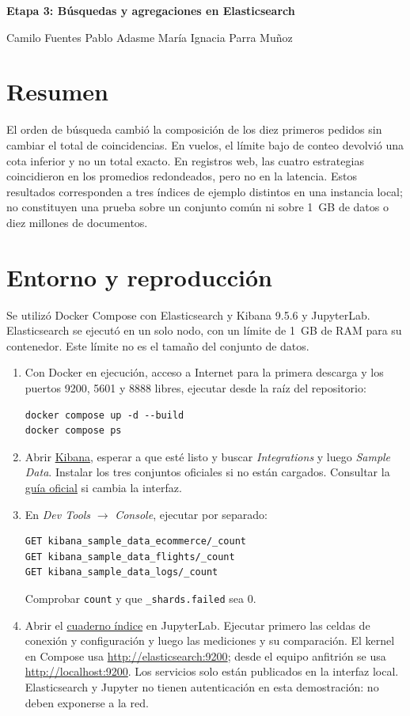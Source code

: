 \documentclass[11pt,a4paper]{article}
\newcommand{\codigo}[1]{\texttt{#1}}
\begin{document}
\begin{center}
{\LARGE\bfseries Etapa 3: Búsquedas y agregaciones en Elasticsearch\par}
\smallskip
Camilo Fuentes \quad Pablo Adasme \quad María Ignacia Parra Muñoz
\end{center}

\section*{Resumen}
El orden de búsqueda cambió la composición de los diez primeros pedidos sin
cambiar el total de coincidencias. En vuelos, el límite bajo de conteo devolvió
una cota inferior y no un total exacto. En registros web, las cuatro estrategias
coincidieron en los promedios redondeados, pero no en la latencia. Estos resultados
corresponden a tres índices de ejemplo distintos en una instancia local; no
constituyen una prueba sobre un conjunto común ni sobre 1~GB de datos o diez
millones de documentos.

\section{Entorno y reproducción}
Se utilizó Docker Compose con Elasticsearch y Kibana 9.5.6 y JupyterLab.
Elasticsearch se ejecutó en un solo nodo, con un límite de 1~GB de RAM para
su contenedor. Este límite no es el tamaño del conjunto de datos.

\begin{enumerate}
\setlength{\itemsep}{0pt}
\item Con Docker en ejecución, acceso a Internet para la primera descarga y
los puertos 9200, 5601 y 8888 libres, ejecutar desde la raíz del repositorio:
\begin{verbatim}
docker compose up -d --build
docker compose ps
\end{verbatim}
\item Abrir \href{http://localhost:5601}{Kibana}, esperar a que esté listo
y buscar \textit{Integrations} y luego \textit{Sample Data}. Instalar los tres
conjuntos oficiales si no están cargados. Consultar la
\href{https://www.elastic.co/docs/manage-data/ingest/sample-data}{guía oficial}
si cambia la interfaz.
\item En \textit{Dev Tools} $\to$ \textit{Console}, ejecutar por separado:
\begin{verbatim}
GET kibana_sample_data_ecommerce/_count
GET kibana_sample_data_flights/_count
GET kibana_sample_data_logs/_count
\end{verbatim}
Comprobar \codigo{count} y que \codigo{\_shards.failed} sea 0.
\item Abrir el
\href{http://localhost:8888/lab/tree/work/00_indice.ipynb}{cuaderno índice}
en JupyterLab. Ejecutar primero las celdas de conexión y configuración y
luego las mediciones y su comparación. El kernel en Compose usa
\url{http://elasticsearch:9200}; desde el equipo anfitrión se usa
\url{http://localhost:9200}. Los servicios solo están publicados en la
interfaz local. Elasticsearch y Jupyter no tienen autenticación en esta
demostración: no deben exponerse a la red.
\end{enumerate}
\end{document}
